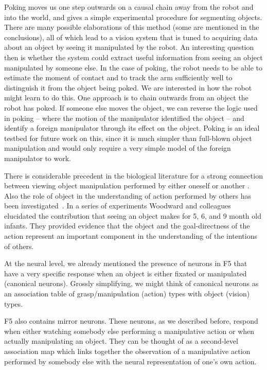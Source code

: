 Poking moves us one step outwards on a causal chain away from the
robot and into the world, and gives a simple experimental procedure
for segmenting objects.  There are many possible elaborations of this
method (some are mentioned in the conclusions), all of which lead to a
vision system that is tuned to acquiring data about an object by
seeing it manipulated by the robot.  An interesting question then is
whether the system could extract useful information from seeing an
object manipulated by someone else.  In the case of poking, the robot
needs to be able to estimate the moment of contact and to track the arm
sufficiently well to distinguish it from the object being poked.  We
are interested in how the robot might learn to do this.  One approach
is to chain outwards from an object the robot has poked.  If someone
else moves the object, we can reverse the logic used in poking --
where the motion of the manipulator identified the object -- and
identify a foreign manipulator through its effect on the object.
Poking is an ideal testbed for future work on this, since it is much
simpler than full-blown object manipulation and would only require a
very simple model of the foreign manipulator to work.

There is considerable precedent in the biological literature for a
strong connection between viewing object manipulation performed by
either oneself or another \cite{wohlsclager02human}. Also
the role of object in the understanding of action performed by others
has been investigated~\cite{woodward98infants}. In a series of
experiments Woodward and colleagues elucidated the contribution that
seeing an object makes for 5, 6, and 9 month old infants. They
provided evidence that the object and the goal-directness of the
action represent an important component in the understanding of the
intentions of others.

At the neural level, we already mentioned the presence of neurons in
F5 that have a very specific response when an object is either fixated
or manipulated (canonical neurons). Grossly simplifying, we might
think of canonical neurons as an association table of
grasp/manipulation (action) types with object (vision) types.

F5 also contains mirror neurons. These neurons, as we described
before, respond when either watching somebody else performing a
manipulative action or when actually manipulating an object. They can
be thought of as a second-level association map which links together
the observation of a manipulative action performed by somebody else
with the neural representation of one's own action.

